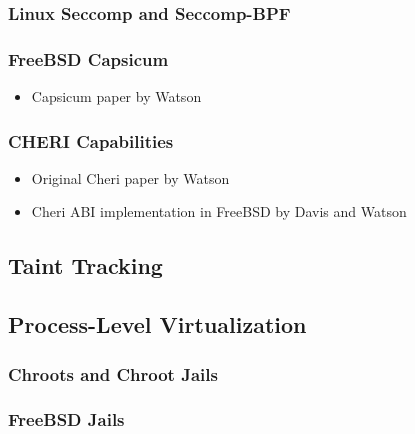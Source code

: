 \subsubsection*{Linux Seccomp and Seccomp-BPF}%
\label{sss:seccomp}

\subsubsection*{FreeBSD Capsicum}
\label{sss:capsicum}

\begin{inprogress}
  \begin{itemize}
    \item Capsicum paper by Watson \etal~\cite{watson2010_capsicum}
  \end{itemize}
\end{inprogress}

\subsubsection*{CHERI Capabilities}
\label{sss:cheri}

\begin{inprogress}
  \begin{itemize}
    \item Original Cheri paper by Watson \etal~\cite{watson2015_cheri}
    \item Cheri ABI implementation in FreeBSD by Davis and Watson \etal~\cite{davis2019_cheriabi}
  \end{itemize}
\end{inprogress}



\subsection{Taint Tracking}%
\label{ss:taint-tracking}



\subsection{Process-Level Virtualization}%
\label{ss:virtualization}

\subsubsection*{Chroots and Chroot Jails}

\subsubsection*{FreeBSD Jails}

